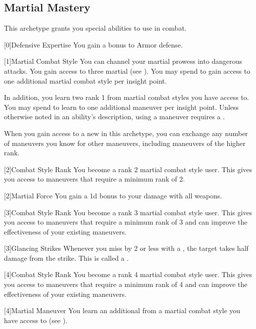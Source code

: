     \newpage
    \subsection{Martial Mastery}
        This archetype grants you special abilities to use in combat.

        [0]{Defensive Expertise} You gain a  bonus to Armor defense.

        {
            [1]{Martial Combat Style}
            You can channel your martial prowess into dangerous attacks.
            You gain access to three martial  (see ).
            You may spend  to gain access to one additional martial combat style per insight point.

            In addition, you learn two rank 1  from martial combat styles you have access to.
            You may spend  to learn to one additional maneuver per insight point.
            Unless otherwise noted in an ability's description, using a maneuver requires a .

            When you gain access to a new  in this archetype,
                you can exchange any number of maneuvers you know for other maneuvers,
                including maneuvers of the higher rank.
        }

        {
            [2]{Combat Style Rank} You become a rank 2 martial combat style user.
            This gives you access to maneuvers that require a minimum rank of 2.

            [2]{Martial Force} You gain a \plus1d bonus to your damage with all weapons.
        }

        {
            [3]{Combat Style Rank} You become a rank 3 martial combat style user.
            This gives you access to maneuvers that require a minimum rank of 3 and can improve the effectiveness of your existing maneuvers.

            [3]{Glancing Strikes} Whenever you miss by 2 or less with a , the target takes half damage from the strike.
            This is called a .
        }

        {
            [4]{Combat Style Rank} You become a rank 4 martial combat style user.
            This gives you access to maneuvers that require a minimum rank of 4 and can improve the effectiveness of your existing maneuvers.

            [4]{Martial Maneuver}
            You learn an additional  from a martial combat style you have access to (see ).
        }

